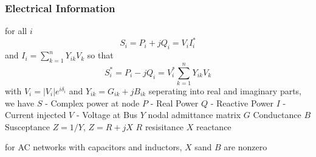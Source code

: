 \subsubsection{Electrical Information}

for all $i$
\begin{equation}
S_i = P_i + j Q_i = V_i I_i^*
\end{equation}
and $I_i = \sum_{k=1}^n Y_{ik} V_k$
so that
\begin{equation}
S_i^* = P_i - j Q_i = V_i^* \sum_{k=1}^n Y_{ik} V_k
\end{equation}
with $V_i = | V_i | e^{i \delta_i}$ and $Y_{ik} = G_{ik} + j B_{ik}$
seperating into real and imaginary parts, we have
$S$ - Complex power at node
$P$ - Real Power
$Q$ - Reactive Power
$I$ - Current injected
$V$ - Voltage at Bus
$Y$ nodal admittance matrix
$G$ Conductance
$B$ Susceptance
$Z = 1/Y$, $Z = R + j X$
$R$ resisitance
$X$ reactance

for AC networks with capacitors and inductors, $X$ sand $B$ are nonzero

